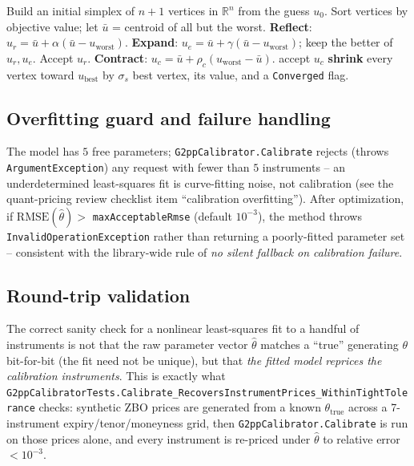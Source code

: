 \documentclass[11pt,a4paper]{article}
\newcommand{\R}{\mathbb{R}}
\newcommand{\coderef}[1]{\texttt{\color{blue!60!black}#1}}
\theoremstyle{definition}
\begin{document}
\begin{algorithm}[H]
\caption{Nelder-Mead (as implemented in \coderef{NelderMead.Minimize})}
\begin{algorithmic}[1]
\State Build an initial simplex of $n{+}1$ vertices in $\R^n$ from the guess $u_0$.
  \State Sort vertices by objective value; let $\bar u$ = centroid of all but the worst.
  \State \textbf{Reflect}: $u_r = \bar u + \alpha(\bar u - u_{\text{worst}})$.
    \State \textbf{Expand}: $u_e = \bar u + \gamma(\bar u - u_{\text{worst}})$; keep the better of $u_r,u_e$.
    \State Accept $u_r$.
  \Else
    \State \textbf{Contract}: $u_c = \bar u + \rho_c(u_{\text{worst}} - \bar u)$.
     accept $u_c$
    \Else{} \textbf{shrink} every vertex toward $u_{\text{best}}$ by $\sigma_s$
    \EndIf
  \EndIf
\EndWhile
\State \Return best vertex, its value, and a \texttt{Converged} flag.
\end{algorithmic}
\end{algorithm}

\subsection{Overfitting guard and failure handling}

The model has $5$ free parameters; \coderef{G2ppCalibrator.Calibrate}
rejects (throws \coderef{ArgumentException}) any request with fewer than $5$
instruments -- an underdetermined least-squares fit is curve-fitting noise,
not calibration (see the quant-pricing review checklist item
``calibration overfitting''). After optimization, if
$\text{RMSE}(\hat\theta) > $ \texttt{maxAcceptableRmse} (default $10^{-3}$),
the method throws \coderef{InvalidOperationException} rather than returning
a poorly-fitted parameter set -- consistent with the library-wide rule of
\emph{no silent fallback on calibration failure}.

\subsection{Round-trip validation}

The correct sanity check for a nonlinear least-squares fit to a handful of
instruments is not that the raw parameter vector $\hat\theta$ matches a
``true'' generating $\theta$ bit-for-bit (the fit need not be unique), but
that \emph{the fitted model reprices the calibration instruments}. This is
exactly what \coderef{G2ppCalibratorTests.Calibrate\_\allowbreak RecoversInstrumentPrices\_\allowbreak WithinTightTolerance}
checks: synthetic ZBO prices are generated from a known $\theta_{\text{true}}$
across a 7-instrument expiry/tenor/moneyness grid, then
\coderef{G2ppCalibrator.Calibrate} is run on those prices alone, and every
instrument is re-priced under $\hat\theta$ to relative error $<10^{-3}$.
\end{document}
